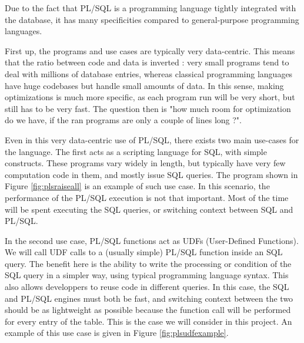\documentclass[twoside,11pt,a4paper]{article}
\begin{document}
Due to the fact that PL/SQL is a programming language tightly integrated with the database, it has many specificities compared to general-purpose programming languages.

First up, the programs and use cases are typically very data-centric. This means that the ratio between code and data is inverted : very small programs tend to deal with millions of database entries, whereas classical programming languages have huge codebases but handle small amounts of data. In this sense, making optimizations is much more specific, as each program run will be very short, but still has to be very fast. The question then is "how much room for optimization do we have, if the ran programs are only a couple of lines long ?".

Even in this very data-centric use of PL/SQL, there exists two main use-cases for the language. The first acts as a scripting language for SQL, with simple constructs. These programs vary widely in length, but typically have very few computation code in them, and mostly issue SQL queries. The program shown in Figure \ref{fig:plsraiseall} is an example of such use case. In this scenario, the performance of the PL/SQL execution is not that important. Most of the time will be spent executing the SQL queries, or switching context between SQL and PL/SQL.

In the second use case, PL/SQL functions act as UDFs (User-Defined Functions). We will call UDF calls to a (usually simple) PL/SQL function inside an SQL query. The benefit here is the ability to write the processing or condition of the SQL query in a simpler way, using typical programming language syntax. This also allows developpers to reuse code in different queries. In this case, the SQL and PL/SQL engines must both be fast, and switching context between the two should be as lightweight as possible because the function call will be performed for every entry of the table. This is the case we will consider in this project. An example of this use case is given in Figure \ref{fig:plsudfexample}.
\end{document}
